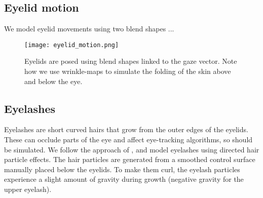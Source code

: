 \subsection{Eyelid motion}

We model eyelid movements using two blend shapes ...

\begin{figure}
    \texttt{[image: eyelid\_motion.png]}
    \caption{Eyelids are posed using blend shapes linked to the gaze vector. Note how we use wrinkle-maps to simulate the folding of the skin above and below the eye.}
\end{figure}

\subsection{Eyelashes}

Eyelashes are short curved hairs that grow from the outer edges of the eyelids. These can occlude parts of the eye and affect eye-tracking algorithms, so should be simulated. We follow the approach of \citet{swirski2014rendering}, and model eyelashes using directed hair particle effects. The hair particles are generated from a smoothed control surface manually placed below the eyelids. To make them curl, the eyelash particles experience a slight amount of gravity during growth (negative gravity for the upper eyelash).